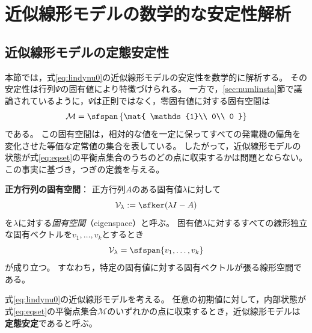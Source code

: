 \documentclass[tombow,dvipdfmx]{corona-a5-1.1}
\begin{document}
\section{近似線形モデルの数学的な安定性解析\advanced}\label{sec:linmathana}

\subsection{近似線形モデルの定態安定性\advanced}

本節では，式\ref{eq:lindynu0}の近似線形モデルの安定性を数学的に解析する。
その安定性は行列$\Psi$の固有値により特徴づけられる。
一方で，\ref{sec:numlinsta}節で議論されているように，$\Psi$は正則ではなく，零固有値に対する固有空間は
\begin{align}\label{eq:eqset}
\mathcal{M} =
 \sfspan\left\{
 \mat{
 \mathds{1}\\
 0\\
 0
 }
 \right\}
\end{align}
である。
この固有空間は，相対的な値を一定に保ってすべての発電機の偏角を変化させた等価な定常値の集合を表している。
したがって，近似線形モデルの状態が式\ref{eq:eqset}の平衡点集合のうちのどの点に収束するかは問題とならない。
この事実に基づき，つぎの定義を与える。

\begin{COLUMN}
\noindent \textbf{正方行列の固有空間}：
正方行列$A$のある固有値$\lambda$に対して
\[
\mathcal{V}_{\lambda}:= \sfker (\lambda I -A)
\]
を$\lambda$に対する\emph{固有空間}（eigenspace）と呼ぶ。
固有値$\lambda$に対するすべての線形独立な固有ベクトルを$v_1,\ldots,v_k$とするとき
\[
\mathcal{V}_{\lambda} = \sfspan\{v_1,\ldots,v_k\}
\]
が成り立つ。
すなわち，特定の固有値に対する固有ベクトルが張る線形空間である。
\end{COLUMN}


\begin{定義}[近似線形モデルの定態安定性]
\label{def:stalin}
式\ref{eq:lindynu0}の近似線形モデルを考える。
任意の初期値に対して，内部状態が式\ref{eq:eqset}の平衡点集合$\mathcal{M}$のいずれかの点に収束するとき，近似線形モデルは\textbf{定態安定}であると呼ぶ。
\end{定義}
\end{document}
